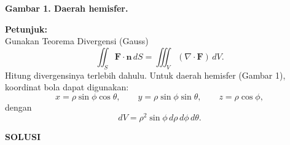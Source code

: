\documentclass[11pt,letterpaper]{article}
\begin{document}
\begin{enumerate}
\begin{center}
          \vspace{0.2cm}
          \textbf{Gambar 1. Daerah hemisfer.}
        \end{center}

        \textbf{Petunjuk:}\\
        Gunakan Teorema Divergensi (Gauss)
        \[
          \iint_S \mathbf{F}\cdot \mathbf{n}\,dS
          =
          \iiint_V (\nabla \cdot \mathbf{F})\,dV.
        \]
        Hitung divergensinya terlebih dahulu. Untuk daerah hemisfer (Gambar 1), koordinat bola dapat digunakan:
        \[
          x=\rho\sin\phi\cos\theta,\qquad
          y=\rho\sin\phi\sin\theta,\qquad
          z=\rho\cos\phi,
        \]
        dengan
        \[
          dV=\rho^2\sin\phi\,d\rho\,d\phi\,d\theta.
        \]
\end{enumerate}

\newpage
\begin{center}
  \textbf{\Large SOLUSI}
\end{center}
\end{document}
